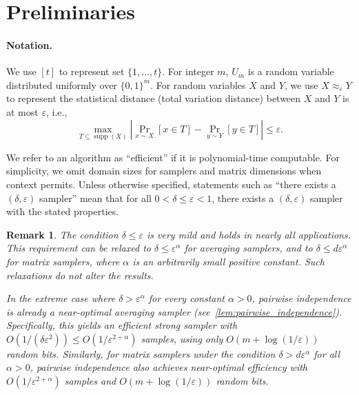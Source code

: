 \documentclass[10pt,a4paper]{article}
\newtheorem{remark}[theorem]{Remark}
\DeclareMathOperator*{\supp}{supp}
\newcommand{\eps}{\varepsilon}
\newcommand{\1}{\mathbbm{1}}
\newcommand{\abs}[1]{\left|#1\right| }
\newcommand{\zo}{\{0, 1\}}
\begin{document}
\section{Preliminaries}

\paragraph{Notation.}  We use $[t]$ to represent set $\{1, \dots, t\}$. For integer $m$, $U_m$ is a random variable distributed uniformly over $\zo^m$. For random variables $X$ and $Y$, we use $X \approx_{\eps} Y$ to represent the statistical distance (total variation distance) between $X$ and $Y$ is at most $\eps$, i.e., \[
    \max_{T \subseteq \supp(X)} \abs{\Pr_{x \sim X}[x \in T] - \Pr_{y \sim Y}[y \in T]} \le \eps.
\]


We refer to an algorithm as ``efficient'' if it is polynomial-time computable.
For simplicity, we omit domain sizes for samplers and matrix dimensions when context permits. Unless otherwise specified, statements such as “there exists a \( (\delta, \eps) \) sampler” mean that for all \( 0 < \delta \le \eps < 1 \), there exists a \( (\delta, \eps) \) sampler with the stated properties.
\begin{remark}
    \label{rem:choice_of_parameters}
    The condition $\delta \le \eps$ is very mild and holds in nearly all applications.
    This requirement can be relaxed to \( \delta \le  \eps^\alpha \)  for averaging samplers, and to \( \delta \le d\eps^\alpha \) for matrix samplers, where $\alpha$ is an arbitrarily small positive constant. Such relaxations do not alter the results.

    In the extreme case where $\delta > \eps^\alpha$ for every constant $\alpha > 0$, pairwise independence is already a near-optimal averaging sampler (see~\cref{lem:pairwise_independence}). Specifically, this yields an efficient strong sampler with $O(1 / (\delta \eps^2)) \le O(1 / \eps^{2+\alpha})$ samples, using only $O(m + \log (1 / \eps))$ random bits. 
    Similarly, for matrix samplers under the condition \( \delta > d \eps^\alpha \) for all \( \alpha > 0 \), pairwise independence also achieves near-optimal efficiency with \( O(1 / \eps^{2+\alpha}) \) samples and \( O(m + \log (1 / \eps)) \) random bits.
\end{remark}
\end{document}
